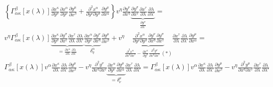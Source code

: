 \begin{multline}
    \left\{\Gamma_{\alpha\kappa}^\beta\left[x(\lambda)\right]
    \frac{\partial x^\kappa}{\partial y^\sigma}
    \frac{\partial x^\alpha}{\partial y^\nu}
    \frac{\partial y^\mu}{\partial x^\beta}
    +
    \frac{\partial^2 x^\alpha}{\partial y^\nu \partial y^\sigma}
    \frac{\partial y^\mu}{\partial x^\alpha}\right\}
    v^\eta \frac{\partial y^\nu}{\partial x^\eta}
    \underbrace{\frac{\partial y^\sigma}{\partial x^\tau}
        \frac{\partial x^\tau}{\partial \lambda}
        \frac{\partial \lambda}{\partial \lambda'}}_{\frac{\partial y^\sigma}{\partial \lambda'}}= \\
    v^\eta\Gamma_{\alpha\kappa}^\beta\left[x(\lambda)\right]
    \underbrace{\frac{\partial x^\kappa}{\partial y^\sigma}
        \frac{\partial y^\sigma}{\partial x^\tau}
        \frac{\partial x^\tau}{\partial \lambda}
        \frac{\partial \lambda}{\partial \lambda'}}_{
        =\frac{\partial x^\kappa}{\partial \lambda}\frac{\partial \lambda}{\partial \lambda'}}
    \underbrace{\frac{\partial x^\alpha}{\partial y^\nu}
        \frac{\partial y^\nu}{\partial x^\eta}}_{\delta_\eta^\alpha}
    \frac{\partial y^\mu}{\partial x^\beta}
    +
    v^\eta\underbrace{\frac{\partial^2 x^\alpha}{\partial y^\nu \partial y^\sigma}
        \frac{\partial y^\nu}{\partial x^\eta}
        \frac{\partial y^\sigma}{\partial x^\tau}}_{
        \frac{\partial^2 x^\alpha}{\partial x^\eta \partial x^\tau} -
        \frac{\partial x^\alpha}{\partial y^\nu}
        \frac{\partial^2 y^\nu}{\partial x^\eta \partial x^\tau}~(*)}
    \frac{\partial x^\tau}{\partial \lambda}
    \frac{\partial \lambda}{\partial \lambda'}
    \frac{\partial y^\mu}{\partial x^\alpha}= \\
    \Gamma_{\alpha\kappa}^\beta\left[x(\lambda)\right]v^\alpha
    \frac{\partial x^\kappa}{\partial \lambda}\frac{\partial \lambda}{\partial \lambda'}
    \frac{\partial y^\mu}{\partial x^\beta} -
    v^\eta\frac{\partial^2 y^\nu}{\partial x^\eta \partial x^\tau}
    \underbrace{\frac{\partial x^\alpha}{\partial y^\nu}
        \frac{\partial y^\mu}{\partial x^\alpha}}_{=\delta^\mu_\nu}
    \frac{\partial x^\tau}{\partial \lambda}
    \frac{\partial \lambda}{\partial \lambda'}=
    \Gamma_{\alpha\kappa}^\beta\left[x(\lambda)\right]v^\alpha
    \frac{\partial x^\kappa}{\partial \lambda}\frac{\partial \lambda}{\partial \lambda'}
    \frac{\partial y^\mu}{\partial x^\beta} -
    v^\eta\frac{\partial^2 y^\mu}{\partial x^\eta \partial x^\tau}
    \frac{\partial x^\tau}{\partial \lambda}
    \frac{\partial \lambda}{\partial \lambda'}
\end{multline}
